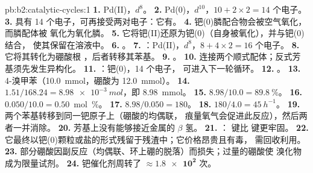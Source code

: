 \begin{solution}{pb:b2:catalytic-cycles:1}
\textbf{1.} Pd(II)，$d^8$。
\textbf{2.} Pd(0)，$d^{10}$，$10 + 2 \times 2 = 14$ 个电子。
\textbf{3.} 具有 14 个电子，可再接受两对电子：它有。
\textbf{4.} 钯(0)膦配合物会被空气氧化，而膦配体被
氧化为氧化膦。
\textbf{5.} 它将钯(II)还原为钯(0)（自身被氧化），并与钯(0)结合，
使其保留在溶液中。
\textbf{6.} 。
\textbf{7.} ：Pd(II)，$d^8$，$8 + 4 \times 2 =
16$ 个电子。
\textbf{8.} 它将其转化为硼酸根 ，后者转移其苯基。
\textbf{9.} 。
\textbf{10.} 连接两个顺式配体；反式芳基须先发生异构化。
\textbf{11.} ：钯(0)，14 个电子，
可进入下一轮循环。
\textbf{12.} 。
\textbf{13.} 4-溴甲苯（\qty{10.0}{mmol}，硼酸为 \qty{12.0}{mmol}）。
\textbf{14.} $1.51/168.24 = \qty{8.98e-3}{mol}$，即 \qty{8.98}{mmol}。
\textbf{15.} $8.98/10.0 = 89.8~\%$。
\textbf{16.} $0.050/10.0 = 0.50$~mol~\%。
\textbf{17.} $8.98/0.050 = 180$。
\textbf{18.} $180/4.0 = \qty{45}{h^{-1}}$。
\textbf{19.} 两个苯基转移到同一钯原子上（硼酸的均偶联，
痕量氧气会促进此反应），然后两者一并消除。
\textbf{20.} 芳基上没有能够接近金属的 $\beta$ 氢。
\textbf{21.} ： 键比  键更牢固。
\textbf{22.} 它最终以钯(0)颗粒或盐的形式残留于残渣中；它价格昂贵且有毒，
需回收利用。
\textbf{23.} 部分硼酸因副反应（均偶联、环上硼的脱落）而损失；过量的硼酸使
溴化物成为限量试剂。
\textbf{24.} 钯催化剂周转了 $\boldsymbol{\approx \num{1.8e2}}$ 次。
\end{solution}
